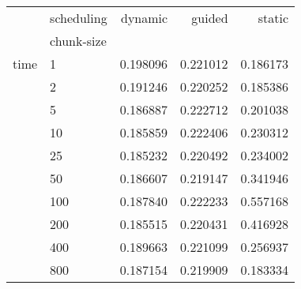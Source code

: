 \begin{tabular}{llrrr}
\toprule
     & scheduling &   dynamic &    guided &    static \\
{} & chunk-size &           &           &           \\
\midrule
time & 1   &  0.198096 &  0.221012 &  0.186173 \\
     & 2   &  0.191246 &  0.220252 &  0.185386 \\
     & 5   &  0.186887 &  0.222712 &  0.201038 \\
     & 10  &  0.185859 &  0.222406 &  0.230312 \\
     & 25  &  0.185232 &  0.220492 &  0.234002 \\
     & 50  &  0.186607 &  0.219147 &  0.341946 \\
     & 100 &  0.187840 &  0.222233 &  0.557168 \\
     & 200 &  0.185515 &  0.220431 &  0.416928 \\
     & 400 &  0.189663 &  0.221099 &  0.256937 \\
     & 800 &  0.187154 &  0.219909 &  0.183334 \\
\bottomrule
\end{tabular}
